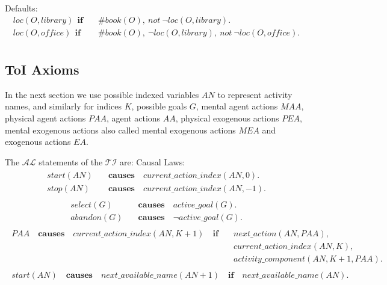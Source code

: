 \documentclass[11pt, oneside]{article}
\begin{document}
Defaults:
\begin{align*}
  loc(O, library)~~\mathbf{if}&\quad \#book(O),~not~\neg loc(O, library).\\
  loc(O, office)~~\mathbf{if}&\quad \#book(O),~\neg loc(O, library),~not~\neg loc(O, office).\\
\end{align*}
	 			  				 			  	 			             

\subsection{ToI Axioms}
In the next section we use possible indexed variables $AN$ to represent activity names, and similarly for indices $K$, possible goals $G$, mental agent actions $MAA$, physical agent actions $PAA$,
agent actions $AA$, physical exogenous actions $PEA$, mental exogenous actions also called mental exogenous actions $MEA$ and exogenous actions $EA$.

The $\mathcal{AL}$ statements of the $\mathcal{TI}$ are:\newline
Causal Laws:
\begin{align}\begin{split}
 start(AN)\quad &\mathbf{causes} \quad current\_action\_index(AN, 0). \\
 stop(AN)\quad &\mathbf{causes} \quad current\_action\_index(AN, -1). 
\end{split}\end{align}
\begin{align}\begin{split}
select(G)\quad &\mathbf{causes} \quad active\_goal(G). \\
abandon(G)\quad &\mathbf{causes} \quad \neg active\_goal(G). 
\end{split}\end{align}
\begin{align}\begin{split}
PAA\quad \mathbf{causes} \quad current\_action\_index(AN, K+1)\quad \mathbf{if}\quad &next\_action(AN, PAA), \\
&current\_action\_index(AN, K),\\
&activity\_component(AN, K+1, PAA).
\end{split}\end{align}
\begin{align}\begin{split}
start(AN) \quad \mathbf{causes} \quad next\_available\_name(AN+1) \quad \mathbf{if}\quad next\_available\_name(AN). 
\end{split}\end{align}
\end{document}
